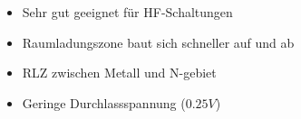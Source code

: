 \begin{frame}
\begin{columns}[c]
\begin{center}
\begin{figure}
      \end{figure}
    \end{center}
    \begin{itemize}
      \item Sehr gut geeignet für HF-Schaltungen
      \item Raumladungszone baut sich schneller auf und ab
      \item RLZ zwischen Metall und N-gebiet
      \item Geringe Durchlassspannung ($0.25V$)
    \end{itemize}
  \end{columns}
\end{frame}

